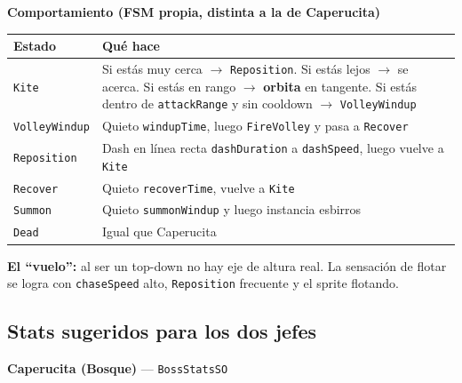 \documentclass[a4paper,12pt]{article}
\newcommand{\code}[1]{\texttt{#1}}
\begin{document}
\textbf{Comportamiento (FSM propia, distinta a la de Caperucita)}

\begin{center}
\begin{longtable}{|l|p{8.8cm}|}
\hline
\textbf{Estado} & \textbf{Qué hace} \\
\hline
\endhead
\code{Kite} & Si estás muy cerca $\to$ \code{Reposition}. Si estás lejos $\to$ se acerca. Si estás en rango $\to$ \textbf{orbita} en tangente. Si estás dentro de \code{attackRange} y sin cooldown $\to$ \code{VolleyWindup} \\
\hline
\code{VolleyWindup} & Quieto \code{windupTime}, luego \code{FireVolley} y pasa a \code{Recover} \\
\hline
\code{Reposition} & Dash en línea recta \code{dashDuration} a \code{dashSpeed}, luego vuelve a \code{Kite} \\
\hline
\code{Recover} & Quieto \code{recoverTime}, vuelve a \code{Kite} \\
\hline
\code{Summon} & Quieto \code{summonWindup} y luego instancia esbirros \\
\hline
\code{Dead} & Igual que Caperucita \\
\hline
\end{longtable}
\end{center}

\textbf{El ``vuelo'':} al ser un top-down no hay eje de altura real. La sensación de flotar se
logra con \code{chaseSpeed} alto, \code{Reposition} frecuente y el sprite flotando.

\subsection{Stats sugeridos para los dos jefes}

\textbf{Caperucita (Bosque)} --- \code{BossStatsSO}
\end{document}
